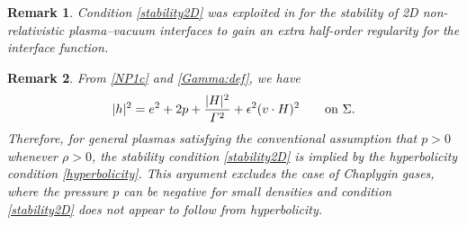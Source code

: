 \documentclass[twoside,11pt]{article}
\numberwithin{equation}{section}
\newtheorem{remark}{Remark}[section]
\begin{document}
\begin{remark}
	{Condition \eqref{stability2D} was exploited in {\rm\cite{MSTTY24MR4754746}} for the stability of 2D non-relativistic plasma--vacuum interfaces to gain an extra half-order regularity for the interface function.}
\end{remark}

\begin{remark}
	From \eqref{NP1c} and \eqref{Gamma:def}, we have
	$$	|h|^2=e^2+2p+ \frac{|H|^2}{ \varGamma^{2}}+ {\epsilon^2}  (v\cdot H)^2
	\qquad\textnormal{on }\Sigma.
	$$
Therefore, for general plasmas satisfying the conventional assumption that $p>0$ whenever $\rho>0$, the stability condition \eqref{stability2D} is implied by the hyperbolicity condition \eqref{hyperbolicity}.
	This argument
	excludes the case of Chaplygin gases, where the pressure $p$ can be negative for small densities and condition \eqref{stability2D} does not appear to follow from hyperbolicity.
\end{remark}





	
\end{document}
